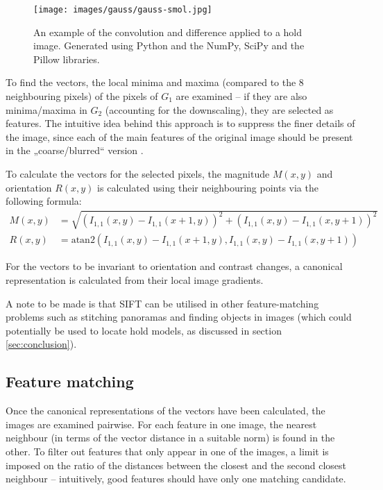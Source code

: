 \begin{figure}
	\centering
	\texttt{[image: images/gauss/gauss-smol.jpg]}
	\caption{An example of the convolution and difference applied to a hold image. Generated using Python and the NumPy, SciPy and the Pillow libraries.}
	\label{fig:gaussexample}
\end{figure}

To find the vectors, the local minima and maxima (compared to the 8 neighbouring pixels) of the pixels of $G_1$ are examined -- if they are also minima/maxima in $G_2$ (accounting for the downscaling), they are selected as features.
The intuitive idea behind this approach is to suppress the finer details of the image, since each of the main features of the original image should be present in the „coarse/blurred“ version \cite{scalespace}.

To calculate the vectors for the selected pixels, the magnitude $M(x,y)$ and orientation $R(x,y)$ is calculated using their neighbouring points via the following formula:
\begin{align}
	M(x,y) &= \sqrt{\left(I_{1,1}(x, y) - I_{1,1}(x + 1, y)\right)^2 + \left(I_{1,1}(x,y) - I_{1,1}(x, y + 1)\right)^2} \\[0.7em]
	R(x,y) &= \mathrm{atan2} \left(I_{1,1}(x, y) - I_{1,1}(x + 1, y), I_{1,1}(x,y) - I_{1,1}(x, y + 1)\right)
\end{align}

For the vectors to be invariant to orientation and contrast changes, a canonical representation is calculated from their local image gradients.

A note to be made is that SIFT can be utilised in other feature-matching problems such as stitching panoramas and finding objects in images (which could potentially be used to locate hold models, as discussed in section \ref{sec:conclusion}).

\subsection{Feature matching}
Once the canonical representations of the vectors have been calculated, the images are examined pairwise.
For each feature in one image, the nearest neighbour (in terms of the vector distance in a suitable norm) is found in the other.
To filter out features that only appear in one of the images, a limit is imposed on the ratio of the distances between the closest and the second closest neighbour -- intuitively, good features should have only one matching candidate.

